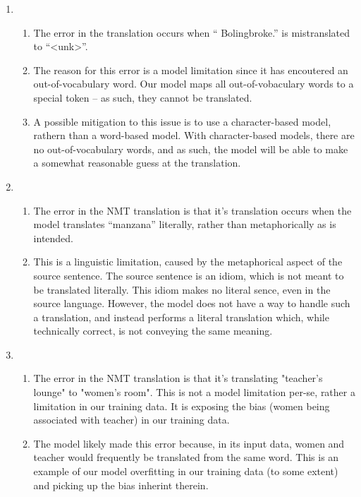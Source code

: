 \documentclass[12pt]{article}
\begin{document}
\begin{enumerate}[label=(\alph*)]
\begin{enumerate}[label=\roman*]
\begin{enumerate}[label=\arabic*]
        \end{enumerate}
      \item
        \begin{enumerate}[label=\arabic*]
          \item The error in the translation occurs when `` Bolingbroke.'' is mistranslated to  ``<unk>''. 
          \item The reason for this error is a model limitation since it has encoutered an out-of-vocabulary word. Our model maps all out-of-vobaculary words to a special token -- as such, they cannot be translated.
          \item A possible mitigation to this issue is to use a character-based model, rathern than a word-based model. With character-based models, there are no out-of-vocabulary words, and as such, the model will be able to make a somewhat reasonable guess at the translation.
        \end{enumerate}
      \item
         \begin{enumerate}[label=\arabic*]
          \item The error in the NMT translation is that it's translation occurs when the model translates ``manzana'' literally, rather than metaphorically as is intended.
          \item This is a linguistic limitation, caused by the metaphorical aspect of the source sentence. The source sentence is an idiom, which is not meant to be translated literally. This idiom makes no literal sence, even in the source language. However, the model does not have a way to handle such a translation, and instead performs a literal translation which, while technically correct, is not conveying the same meaning. 
        \end{enumerate}
      \item
        \begin{enumerate}[label=\arabic*]
          \item The error in the NMT translation is that it's translating "teacher's lounge" to "women's room". This is not a model limitation per-se, rather a limitation in our training data. It is exposing the bias (women being associated with teacher) in our training data.
          \item The model likely made this error because, in its input data, women and teacher would frequently be translated from the same word. This is an example of our model overfitting in our training data (to some extent) and picking up the bias inherint therein.

\end{enumerate}
\end{enumerate}
\end{enumerate}
\end{document}
